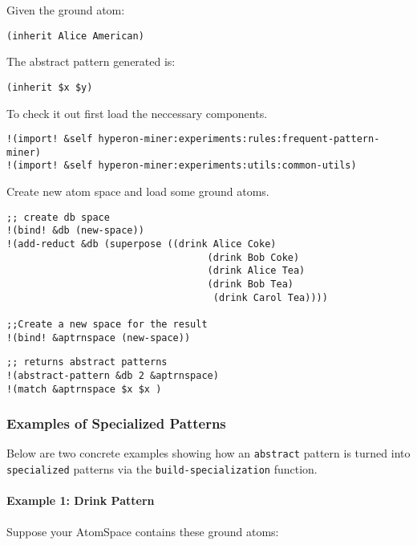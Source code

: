 \documentclass{article}
\begin{document}
Given the ground atom:

\begin{verbatim}
(inherit Alice American)
\end{verbatim}

The abstract pattern generated is:

\begin{verbatim}
(inherit $x $y)
\end{verbatim}

To check it out first load the neccessary components.


\begin{verbatim}
!(import! &self hyperon-miner:experiments:rules:frequent-pattern-miner)
!(import! &self hyperon-miner:experiments:utils:common-utils)
\end{verbatim}

Create new atom space and load some ground atoms.


\begin{verbatim}
;; create db space 
!(bind! &db (new-space))
!(add-reduct &db (superpose ((drink Alice Coke)
                                   (drink Bob Coke)
                                   (drink Alice Tea)
                                   (drink Bob Tea)
                                    (drink Carol Tea))))
                                    
;;Create a new space for the result                                   
!(bind! &aptrnspace (new-space))
\end{verbatim}

    \begin{verbatim}
;; returns abstract patterns
!(abstract-pattern &db 2 &aptrnspace)
!(match &aptrnspace $x $x )
    \end{verbatim}

\subsubsection{Examples of Specialized Patterns}

Below are two concrete examples showing how an \texttt{abstract} pattern is turned into \texttt{specialized} patterns via the \texttt{build-specialization} function.

\paragraph{Example 1: Drink Pattern}

Suppose your AtomSpace contains these ground atoms:
\end{document}
